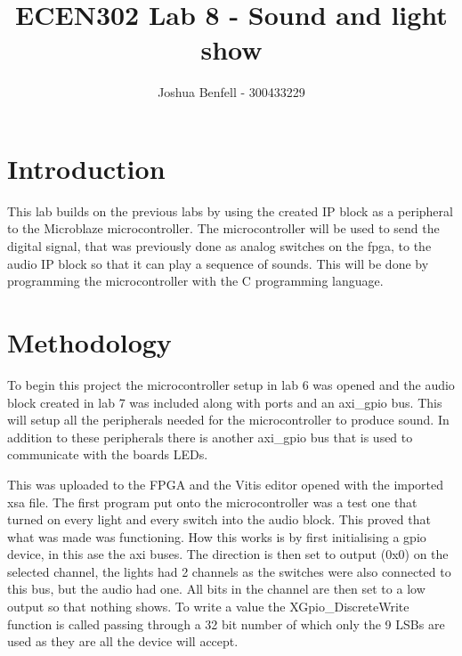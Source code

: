 \documentclass[a4paper, 12pt]{article}
\title{ECEN302 Lab 8 - Sound and light show}
\author{Joshua Benfell - 300433229}
\begin{document}
	\maketitle
	
	\section{Introduction}
		This lab builds on the previous labs by using the created IP block as a peripheral to the Microblaze microcontroller. The microcontroller will be used to send the digital signal, that was previously done as analog switches on the fpga, to the audio IP block so that it can play a sequence of sounds. This will be done by programming the microcontroller with the C programming language.
	\section{Methodology}
		To begin this project the microcontroller setup in lab 6 was opened and the audio block created in lab 7 was included along with ports and an axi\_gpio bus. This will setup all the peripherals needed for the microcontroller to produce sound. In addition to these peripherals there is another axi\_gpio bus that is used to communicate with the boards LEDs.
		\par
		This was uploaded to the FPGA and the Vitis editor opened with the imported xsa file. The first program put onto the microcontroller was a test one that turned on every light and every switch into the audio block. This proved that what was made was functioning. How this works is by first initialising a gpio device, in this ase the axi buses. The direction is then set to output (0x0) on the selected channel, the lights had 2 channels as the switches were also connected to this bus, but the audio had one. All bits in the channel are then set to a low output so that nothing shows. To write a value the XGpio\_DiscreteWrite function is called passing through a 32 bit number of which only the 9 LSBs are used as they are all the device will accept. 
\end{document}
